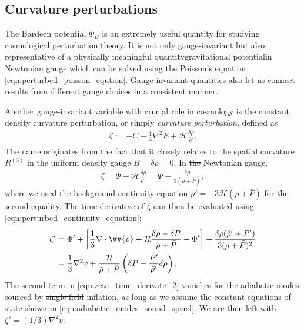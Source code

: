 \documentclass[a4paper,12pt,times,custombib,print,index]{Classes/PhDThesisPSnPDF} %
\providecommand{\DIFadd}[1]{{\protect\color{blue}\uwave{#1}}} %
\providecommand{\DIFdel}[1]{{\protect\color{red}\sout{#1}}}                      %
\providecommand{\DIFaddbegin}{} %
\providecommand{\DIFaddend}{} %
\providecommand{\DIFdelbegin}{} %
\providecommand{\DIFdelend}{} %
\newcommand{\DIFscaledelfig}{0.5}
\newlength{\DIFdelgraphicswidth} %
\newlength{\DIFdelgraphicsheight} %
\newcommand{\DIFaddincludegraphics}[2][]{{\color{blue}\fbox{\DIFOincludegraphics[#1]{#2}}}} %
\newcommand{\DIFdelincludegraphics}[2][]{%
\sbox{\DIFdelgraphicsbox}{\DIFOincludegraphics[#1]{#2}}%
\settoboxwidth{\DIFdelgraphicswidth}{\DIFdelgraphicsbox} %
\settoboxtotalheight{\DIFdelgraphicsheight}{\DIFdelgraphicsbox} %
\scalebox{\DIFscaledelfig}{%
\parbox[b]{\DIFdelgraphicswidth}{\usebox{\DIFdelgraphicsbox}\\[-\baselineskip] \rule{\DIFdelgraphicswidth}{0em}}\llap{\resizebox{\DIFdelgraphicswidth}{\DIFdelgraphicsheight}{%
\setlength{\unitlength}{\DIFdelgraphicswidth}%
\begin{picture}(1,1)%
\thicklines\linethickness{2pt} %
{\color[rgb]{1,0,0}\put(0,0){\framebox(1,1){}}}%
{\color[rgb]{1,0,0}\put(0,0){\line( 1,1){1}}}%
{\color[rgb]{1,0,0}\put(0,1){\line(1,-1){1}}}%
\end{picture}%
}\hspace*{3pt}}} %
} %
\DeclareRobustCommand{\DIFaddbegin}{\DIFOaddbegin \let\includegraphics\DIFaddincludegraphics} %
\DeclareRobustCommand{\DIFaddend}{\DIFOaddend \let\includegraphics\DIFOincludegraphics} %
\DeclareRobustCommand{\DIFdelbegin}{\DIFOdelbegin \let\includegraphics\DIFdelincludegraphics} %
\DeclareRobustCommand{\DIFdelend}{\DIFOaddend \let\includegraphics\DIFOincludegraphics} %
\begin{document}
\subsection{Curvature perturbations} \label{section:curvature_perturbations}

The Bardeen potential $\Phi_B$ is an extremely useful quantity for studying cosmological perturbation theory. It is not only gauge-invariant but also representative of a physically meaningful quantity\textemdash gravitational potential\textemdash in Newtonian gauge which can be solved using the Poisson's equation \eqref{eqn:perturbed_poisson_eqution}. Gauge-invariant quantities also let us connect results from different gauge choices in a consistent manner.

Another gauge-invariant variable \DIFdelbegin \DIFdel{with }\DIFdelend \DIFaddbegin \DIFadd{which plays a }\DIFaddend crucial role in cosmology is the constant density curvature perturbation, or simply \textit{curvature perturbation}, defined as
\begin{align}
	\zeta := - C + \frac{1}{3} \nabla^2 E + \mathcal{H} \frac{\delta\rho}{\bar{\rho}'}. \label{def:curvature_perturbation}
\end{align}
The name originates from the fact that it closely relates to the spatial curvature $R^{(3)}$ in the uniform density gauge $B=\delta\rho=0$. In \DIFdelbegin \DIFdel{the }\DIFdelend Newtonian gauge,
\begin{align}
	\zeta = \Phi + \mathcal{H}\frac{\delta\rho}{\bar{\rho}'} = \Phi - \frac{\delta\rho}{3(\bar{\rho}+\bar{P})},
\end{align}
where we used the background continuity equation $\bar{\rho}'=-3\mathcal{H}(\bar{\rho}+\bar{P})$ for the second equality. The time derivative of $\zeta$ can then be evaluated using \eqref{eqn:perturbed_continuity_equation}:
\begin{align}
	\zeta' &= \Phi' + \left[ \frac{1}{3}\nabla\cdot\vv{v} + \mathcal{H}\frac{\delta\rho + \delta P}{\bar{\rho} + \bar{P}} - \Phi' \right] + \frac{\delta\rho (\bar{\rho}' + \bar{P}')}{3(\bar{\rho}+\bar{P})^2}  \label{eqn:zeta_time_derivate_1} \\
	&= \frac{1}{3}\nabla^2 v + \frac{\mathcal{H}}{\bar{\rho} + \bar{P}} \left( \delta P - \frac{\bar{P}'}{\bar{\rho}'} \delta\rho \right). \label{eqn:zeta_time_derivate_2}
\end{align}
The second term in \eqref{eqn:zeta_time_derivate_2} vanishes for the adiabatic modes sourced by \DIFdelbegin \DIFdel{single field }\DIFdelend \DIFaddbegin \DIFadd{single-field }\DIFaddend inflation, as long as we assume the constant equations of state shown in \eqref{eqn:adiabatic_modes_sound_speed}. We are then left with $\zeta' = (1/3) \nabla^2 v$.
\end{document}
